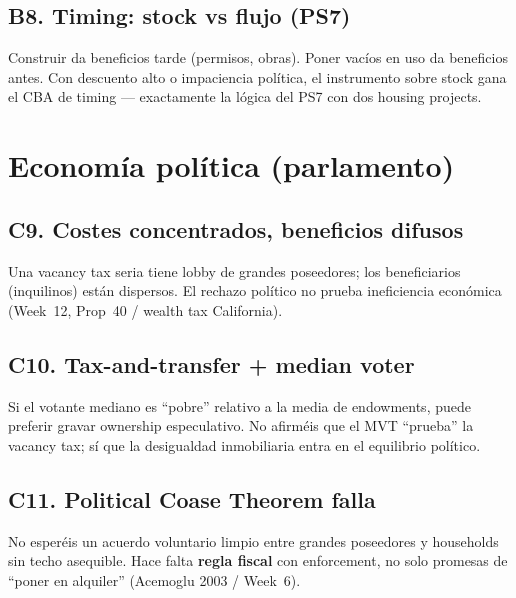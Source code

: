 \documentclass[11pt,a4paper]{report}
\begin{document}
\subsection{B8. Timing: stock vs flujo (PS7)}

\begin{intuicion}
Construir da beneficios tarde (permisos, obras). Poner vac\'ios en uso da
beneficios antes. Con descuento alto o impaciencia pol\'itica, el instrumento
sobre stock gana el CBA de timing --- exactamente la l\'ogica del PS7 con dos
housing projects.
\end{intuicion}

\section{Econom\'ia pol\'itica (parlamento)}

\subsection{C9. Costes concentrados, beneficios difusos}

\begin{intuicion}
Una vacancy tax seria tiene lobby de grandes poseedores; los beneficiarios
(inquilinos) est\'an dispersos. El rechazo pol\'itico no prueba ineficiencia
econ\'omica (Week~12, Prop~40 / wealth tax California).
\end{intuicion}

\subsection{C10. Tax-and-transfer + median voter}

\begin{intuicion}
Si el votante mediano es ``pobre'' relativo a la media de endowments, puede
preferir gravar ownership especulativo. No afirm\'eis que el MVT ``prueba''
la vacancy tax; s\'i que la desigualdad inmobiliaria entra en el equilibrio pol\'itico.
\end{intuicion}

\subsection{C11. Political Coase Theorem falla}

\begin{intuicion}
No esper\'eis un acuerdo voluntario limpio entre grandes poseedores y
households sin techo asequible. Hace falta \textbf{regla fiscal} con enforcement,
no solo promesas de ``poner en alquiler'' (Acemoglu 2003 / Week~6).
\end{intuicion}
\end{document}
